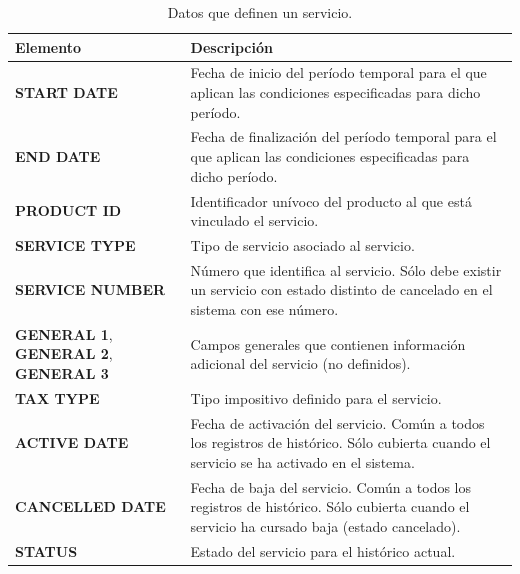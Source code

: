 \begin{table}
  \centering
  \setlength{\leftmargini}{0.4cm}
  \resizebox{14cm}{!} {
  \begin{tabular}{|m{4.5cm} m{11cm}|}
  \rowcolor{udcpink!25}
  \hline
  	\textbf{Elemento} & \textbf{Descripción} \\\hline
  	\textbf{START DATE} & Fecha de inicio del período temporal para el que aplican las condiciones especificadas para dicho período.\\
  	\textbf{END DATE} & Fecha de finalización del período temporal para el que aplican las condiciones especificadas para dicho período.\\
	\textbf{PRODUCT ID} & Identificador unívoco del producto al que está vinculado el servicio.\\
	\textbf{SERVICE TYPE} & Tipo de servicio asociado al servicio.\\
	\textbf{SERVICE NUMBER} & Número que identifica al servicio. Sólo debe existir un servicio con estado distinto de cancelado en el sistema con ese número.\\
	\textbf{GENERAL 1}, \textbf{GENERAL 2}, \textbf{GENERAL 3} & Campos generales que contienen información adicional del servicio (no definidos).\\	
	\textbf{TAX TYPE} & Tipo impositivo definido para el servicio.\\
	\textbf{ACTIVE DATE} & Fecha de activación del servicio. Común a todos los registros de histórico. Sólo cubierta cuando el servicio se ha activado en el sistema.\\	
	\textbf{CANCELLED DATE} & Fecha de baja del servicio. Común a todos los registros de histórico. Sólo cubierta cuando el servicio ha cursado baja (estado cancelado).	\\
	\textbf{STATUS} & Estado del servicio para el histórico actual.	
	\\\hline
  \end{tabular}
  } %
  \caption{Datos que definen un servicio.}
  \label{tab:servicio}
\end{table}


